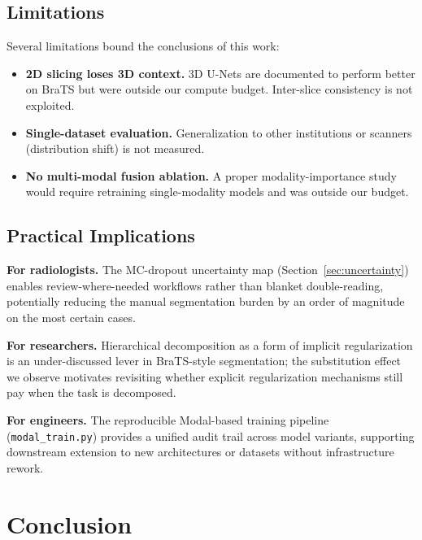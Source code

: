 \documentclass[conference]{IEEEtran}
\begin{document}
\subsection{Limitations}

Several limitations bound the conclusions of this work:

\begin{itemize}
\item \textbf{2D slicing loses 3D context.} 3D U-Nets are documented to
perform better on BraTS but were outside our compute budget.
Inter-slice consistency is not exploited.
\item \textbf{Single-dataset evaluation.} Generalization to other
institutions or scanners (distribution shift) is not measured.
\item \textbf{No multi-modal fusion ablation.} A proper modality-importance
study would require retraining single-modality models and was outside
our budget.
\end{itemize}

\subsection{Practical Implications}

\textbf{For radiologists.} The MC-dropout uncertainty map
(Section~\ref{sec:uncertainty}) enables review-where-needed workflows
rather than blanket double-reading, potentially reducing the manual
segmentation burden by an order of magnitude on the most certain cases.

\textbf{For researchers.} Hierarchical decomposition as a form of
implicit regularization is an under-discussed lever in BraTS-style
segmentation; the substitution effect we observe motivates revisiting
whether explicit regularization mechanisms still pay when the task is
decomposed.

\textbf{For engineers.} The reproducible Modal-based training pipeline
(\texttt{modal\_train.py}) provides a unified audit trail across model
variants, supporting downstream extension to new architectures or
datasets without infrastructure rework.

\section{Conclusion}
\label{sec:conclusion}
\end{document}
